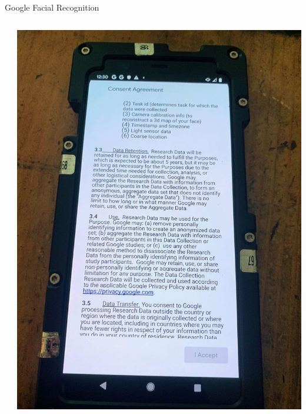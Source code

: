 \documentclass[main]{subfiles}
\begin{document}
\begin{frame}{Google Facial Recognition}
\begin{columns}
\begin{column}{0.3\textwidth}
\end{column}
\begin{column}{0.3\textwidth}
    \includegraphics[width=\textwidth]{figures/google_fr/consent.jpeg}
\end{column}
\end{columns}

\end{frame}
\end{document}
